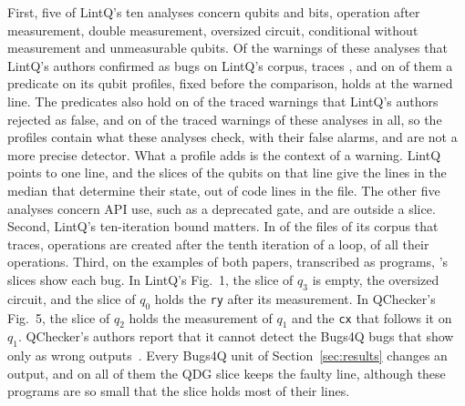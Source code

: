 First, five of LintQ's ten analyses concern qubits and bits, operation after measurement, double measurement,
oversized circuit, conditional without measurement and unmeasurable qubits. Of the \numLqQubitTp{} warnings of
these analyses that LintQ's authors confirmed as bugs on LintQ's corpus, \tool{} traces \numLqQubitTraced{}, and on
\numLqQubitExposed{} of them a predicate on its qubit profiles, fixed before the comparison, holds at the warned
line. The predicates also hold on \numLqFpFires{} of the \numLqFpTraced{} traced warnings that LintQ's authors
rejected as false, and on \numLqSarifFires{} of the \numLqSarifTraced{} traced warnings of these analyses in
all, so the profiles contain what these analyses check, with their false alarms, and are not a more precise
detector. What a profile adds is the context of a warning. LintQ points to one line, and the slices of the
qubits on that line give the \numLqReadMedian{} lines in the median that determine their state, out of
\numLqCodeMedian{} code lines in the file. The other five analyses concern API use, such as a deprecated
gate, and are outside a slice. Second, LintQ's ten-iteration bound matters. In \numLqBeyondTenFiles{} of the
\numScaleSOneSliced{} files of its corpus that \tool{} traces, operations are created after the tenth iteration of a
loop, \numLqBeyondTenOpsPct{} of all their operations. Third, on the examples of both papers, transcribed as
programs, \tool{}'s slices show each bug. In LintQ's Fig.~1, the slice of $q_3$ is empty, the oversized circuit,
and the slice of $q_0$ holds the \texttt{ry} after its measurement. In QChecker's Fig.~5, the slice of $q_2$ holds
the measurement of $q_1$ and the \texttt{cx} that follows it on $q_1$. QChecker's authors report that it cannot detect the Bugs4Q bugs that show only as wrong
outputs~\cite{zhao2023qchecker}. Every Bugs4Q unit of Section~\ref{sec:results} changes an
output, and on all \numLinesUnits{} of them the QDG slice keeps the faulty line, although these programs are so
small that the slice holds most of their lines.

